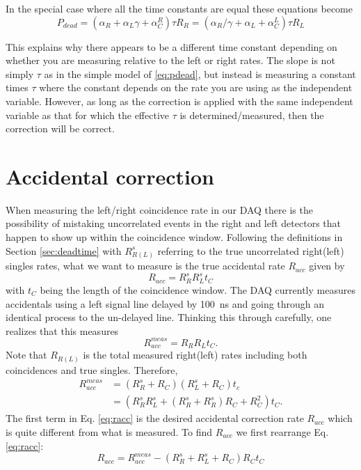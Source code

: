 \documentclass[12pt]{article}
\begin{document}
In the special case where all the time constants are equal these equations become
\[
P_{dead}=\left(\alpha_R+\alpha_L\gamma+\alpha_C^R\right)\tau R_R=\left(\alpha_R/\gamma+\alpha_L+\alpha^L_C\right)\tau R_L
\]

This explains why there appears to be a different time constant depending on whether you are measuring relative to the left or right rates. The slope is not simply $\tau$ as in the simple model of \ref{eq:pdead}, but instead is measuring a constant times $\tau$ where the constant depends on the rate you are using as the independent variable. However, as long as the correction is applied with the same independent variable as that for which the effective $\tau$ is determined/measured, then the correction will be correct.

\section{Accidental correction}
When measuring the left/right coincidence rate in our DAQ there is the possibility of mistaking uncorrelated events in the right and left detectors that happen to show up within the coincidence window. Following the definitions in Section \ref{sec:deadtime} with $R_{R(L)}^s$ referring to the true uncorrelated right(left) singles rates, what we want to measure is the true accidental rate $R_{acc}$ given by
\begin{equation}
R_{acc}=R_R^sR_L^st_C
\end{equation}
with $t_C$ being the length of the coincidence window. The DAQ currently measures accidentals using a left signal line delayed by 100~ns and going through an identical process to the un-delayed line. Thinking this through carefully, one realizes that this measures
\begin{equation}
\label{eq:raccmeas}
R_{acc}^{meas}=R_RR_Lt_C.
\end{equation}
Note that $R_{R(L)}$ is the total measured right(left) rates including both coincidences and true singles. Therefore,
\begin{align}
R_{acc}^{meas}&=(R_R^s+R_C)(R_L^s+R_C)t_c\\
&=\left(R_R^sR_L^s+(R_R^s+R_R^s)R_C+R_C^2\right)t_C\label{eq:racc}.
\end{align}
The first term in Eq. \ref{eq:racc} is the desired accidental correction rate $R_{acc}$ which is quite different from what is measured. To find $R_{acc}$ we first rearrange Eq. \ref{eq:racc}:
\begin{equation}
\label{eq:raccrearranged}
R_{acc}=R^{meas}_{acc}-\left(R_R^s+R_L^s+R_C\right)R_Ct_C
\end{equation}
\end{document}
